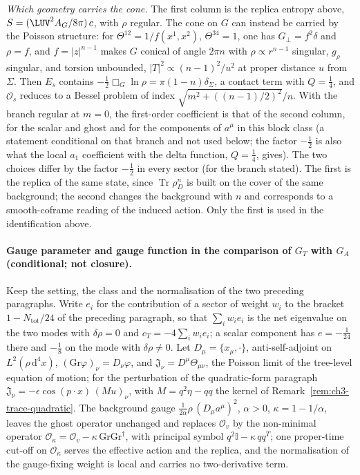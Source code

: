 \emph{Which geometry carries the cone.} The first column is the replica entropy above, \(S=(\LUV^2A_G/8\pi)\,c\), with \(\rho\) regular. The cone on \(G\) can instead be carried by the Poisson structure: for \(\Theta^{12}=1/f(x^1,x^2)\), \(\Theta^{34}=1\), one has \(G_\perp=f^2\delta\) and \(\rho=f\), and \(f=|z|^{n-1}\) makes \(G\) conical of angle \(2\pi n\) with \(\rho\propto r^{n-1}\) singular, \(g_\rho\) singular, and torsion unbounded, \(|T|^2\propto(n-1)^2/u^2\) at proper distance \(u\) from \(\Sigma\). Then \(E_s\) contains \(-\tfrac12\Box_G\ln\rho=\pi(1-n)\delta_\Sigma\), a contact term with \(Q=\tfrac14\), and \(\mathcal O_s\) reduces to a Bessel problem of index \(\sqrt{m^2+((n-1)/2)^2}/n\). With the branch regular at \(m=0\), the first-order coefficient is that of the second column, for the scalar and ghost and for the components of \(a^\mu\) in this block class (a statement conditional on that branch and not used below; the factor \(-\tfrac12\) is also what the local \(a_1\) coefficient with the delta function, \(Q=\tfrac14\), gives). The two choices differ by the factor \(-\tfrac12\) in every sector (for the branch stated). The first is the replica of the same state, since \(\operatorname{Tr}\rho_D^n\) is built on the cover of the same background; the second changes the background with \(n\) and corresponds to a smooth-coframe reading of the induced action. Only the first is used in the identification above.





\paragraph{Gauge parameter and gauge function in the comparison of \(G_T\) with \(G_A\) (conditional; not closure).} \label{detail:sec-B-paragraphgaugeparameterandgaug-4}

Keep the setting, the class and the normalisation of the two preceding paragraphs. Write \(e_i\) for the contribution of a sector of weight \(w_i\) to the bracket \(1-N_{\mathrm{tot}}/24\) of the preceding paragraph, so that \(\sum_iw_ie_i\) is the net eigenvalue on the two modes with \(\delta\rho=0\) and \(c_T=-4\sum_iw_ie_i\); a scalar component has \(e=-\tfrac1{24}\) there and \(-\tfrac18\) on the mode with \(\delta\rho\neq0\). Let \(D_\mu=\{x_\mu,\cdot\}\), anti-self-adjoint on \(L^2(\rho\,\mathrm d^4x)\), \((\mathrm{Gr}\varphi)_\nu=D_\nu\varphi\), and \(\mathfrak J_\nu=D^\mu\Theta_{\mu\nu}\), the Poisson limit of the tree-level equation of motion; for the perturbation of the quadratic-form paragraph \(\mathfrak J_\nu=-\epsilon\cos(p\cdot x)\,(Mu)_\nu\), with \(M=q^2\eta-qq\) the kernel of Remark~\ref{rem:ch3-trace-quadratic}. The background gauge \(\tfrac1{2\alpha}\rho\,(D_\mu a^\mu)^2\), \(\alpha>0\), \(\kappa=1-1/\alpha\), leaves the ghost operator unchanged and replaces \(\mathcal O_v\) by the non-minimal operator \(\mathcal O_\kappa=\mathcal O_v-\kappa\,\mathrm{Gr}\mathrm{Gr}^\dagger\), with principal symbol \(q^2\mathbb I-\kappa\,qq^{T}\); one proper-time cut-off on \(\mathcal O_\kappa\) serves the effective action and the replica, and the normalisation of the gauge-fixing weight is local and carries no two-derivative term.



